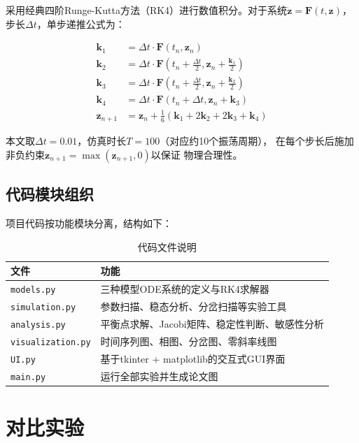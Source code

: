 \documentclass[UTF8]{ctexart}
\begin{document}
采用经典四阶Runge-Kutta方法（RK4）进行数值积分。对于系统$\dot{\mathbf{z}} = \mathbf{F}(t, \mathbf{z})$，
步长$\Delta t$，单步递推公式为：

\begin{align}
    \mathbf{k}_1 &= \Delta t \cdot \mathbf{F}(t_n, \mathbf{z}_n) \\
    \mathbf{k}_2 &= \Delta t \cdot \mathbf{F}(t_n + \frac{\Delta t}{2}, \mathbf{z}_n + \frac{\mathbf{k}_1}{2}) \\
    \mathbf{k}_3 &= \Delta t \cdot \mathbf{F}(t_n + \frac{\Delta t}{2}, \mathbf{z}_n + \frac{\mathbf{k}_2}{2}) \\
    \mathbf{k}_4 &= \Delta t \cdot \mathbf{F}(t_n + \Delta t, \mathbf{z}_n + \mathbf{k}_3) \\
    \mathbf{z}_{n+1} &= \mathbf{z}_n + \frac{1}{6}(\mathbf{k}_1 + 2\mathbf{k}_2 + 2\mathbf{k}_3 + \mathbf{k}_4)
\end{align}

本文取$\Delta t = 0.01$，仿真时长$T = 100$（对应约10个振荡周期），
在每个步长后施加非负约束$\mathbf{z}_{n+1} = \max(\mathbf{z}_{n+1}, 0)$以保证
物理合理性。

\subsection{代码模块组织}

项目代码按功能模块分离，结构如下：

\begin{table}[H]
\centering
\caption{代码文件说明}
\begin{tabular}{l|l}
\hline
\textbf{文件} & \textbf{功能} \\
\hline
\texttt{models.py} & 三种模型ODE系统的定义与RK4求解器 \\
\texttt{simulation.py} & 参数扫描、稳态分析、分岔扫描等实验工具 \\
\texttt{analysis.py} & 平衡点求解、Jacobi矩阵、稳定性判断、敏感性分析 \\
\texttt{visualization.py} & 时间序列图、相图、分岔图、零斜率线图 \\
\texttt{UI.py} & 基于tkinter + matplotlib的交互式GUI界面 \\
\texttt{main.py} & 运行全部实验并生成论文图 \\
\hline
\end{tabular}
\end{table}

\section{对比实验}
\end{document}
